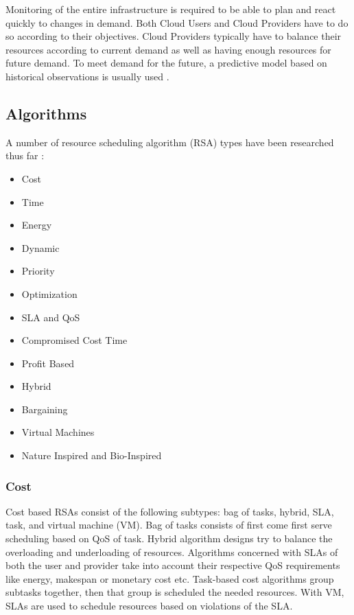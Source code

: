 \documentclass[fullapage,12pt]{article}
\begin{document}
Monitoring of the entire infrastructure is required to be able to plan and react quickly to changes in demand. Both Cloud Users and Cloud Providers have to do so according to their objectives.
Cloud Providers typically have to balance their resources according to current demand as well as having enough resources for future demand. To meet demand for the future, a predictive model based on historical observations is usually used \cite{Jennings2015}.

\subsection{Algorithms} \label{sub:schedalgorithms}

A number of resource scheduling algorithm (RSA) types have been researched thus far \cite{Singh2016}:
\begin{itemize}
    \item Cost
    \item Time
    \item Energy
    \item Dynamic
    \item Priority
    \item Optimization
    \item SLA and QoS
    \item Compromised Cost Time
    \item Profit Based
    \item Hybrid
    \item Bargaining
    \item Virtual Machines
    \item Nature Inspired and Bio-Inspired
\end{itemize}



\subsubsection{Cost} \label{ssub:algCost}

Cost based RSAs consist of the following subtypes: bag of tasks, hybrid, SLA, task, and virtual machine (VM).
Bag of tasks consists of first come first serve scheduling based on QoS of task.
Hybrid algorithm designs try to balance the overloading and underloading of resources.
Algorithms concerned with SLAs of both the user and provider take into account their respective QoS requirements like energy, makespan or monetary cost etc.
Task-based cost algorithms group subtasks together, then that group is scheduled the needed resources.
With VM, SLAs are used to schedule resources based on violations of the SLA.
\end{document}
